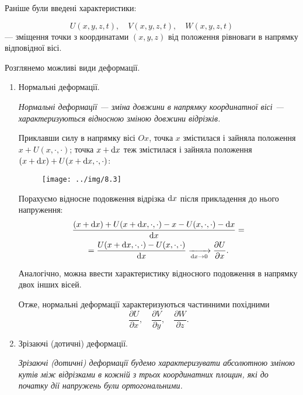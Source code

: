 Раніше були введені характеристики:

\begin{equation}
	U(x, y, z, t), \quad V(x, y, z, t), \quad W(x, y, z, t)
\end{equation}
--- зміщення точки з координатами $(x, y, z)$ від положення рівноваги в напрямку відповідної вісі. \medskip

Розглянемо можливі види деформації.
\begin{enumerate}
	\item Нормальні деформації. \smallskip

	\begin{definition}
		\it{Нормальні деформації} --- зміна довжини в напрямку координатної вісі --- характеризуються відносною зміною довжини відрізків.
	\end{definition}

	Приклавши силу в напрямку вісі $Ox$, точка $x$ змістилася і зайняла положення $x + U(x, \cdot, \cdot)$; точка $x + \mathop{}\!\mathrm{d} x$ теж змістилася і зайняла положення $(x + \mathop{}\!\mathrm{d} x) + U(x + \mathop{}\!\mathrm{d} x, \cdot, \cdot)$:
	\begin{figure}[H]
		\centering
		\texttt{[image: ../img/8.3]}
	\end{figure}

	Порахуємо відносне подовження відрізка $\mathop{}\!\mathrm{d} x$ після прикладення до нього напруження:
	\begin{multline}
		\frac{(x + \mathop{}\!\mathrm{d} x) + U(x + \mathop{}\!\mathrm{d} x, \cdot, \cdot) - x - U(x, \cdot, \cdot) - \mathop{}\!\mathrm{d} x}{\mathop{}\!\mathrm{d} x} = \\
		= \frac{U(x + \mathop{}\!\mathrm{d} x, \cdot, \cdot) - U(x, \cdot, \cdot)}{\mathop{}\!\mathrm{d} x} \xrightarrow[\mathop{}\!\mathrm{d} x \to 0]{} \frac{\partial U}{\partial x}.
	\end{multline}

	Аналогічно, можна ввести характеристику відносного подовження в напрямку двох інших вісей. \medskip

	Отже, нормальні деформації характеризуються частинними похідними
	\begin{equation}
		\frac{\partial U}{\partial x}, \quad \frac{\partial V}{\partial y}, \quad \frac{\partial W}{\partial z}.
	\end{equation}

	\item Зрізаючі (дотичні) деформації. \smallskip

	\begin{definition} 
		\it{Зрізаючі (дотичні) деформації} будемо характеризувати абсолютною зміною кутів між відрізками в кожній з трьох координатних площин, які до початку дії напружень були ортогональними.
	\end{definition}


\end{enumerate}
